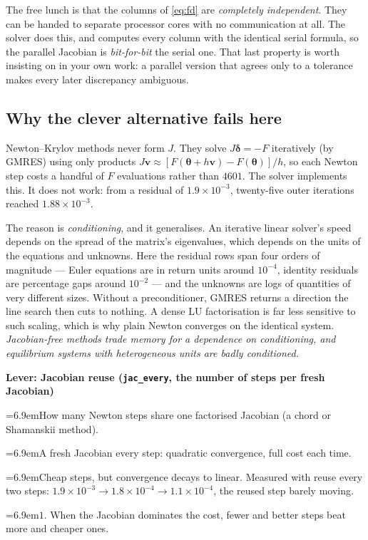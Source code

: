 \documentclass[10pt,a4paper]{article}
\newcommand{\leverrow}[2]{\par\noindent\hangindent=6.9em\hangafter=1\makebox[6.9em][l]{\textit{#1}}#2}
\newenvironment{lever}[1]{\par\begin{framed}\small\noindent\textcolor{levcol}{\textbf{Lever: #1}}\par\vspace{2pt}}{\end{framed}}
\theoremstyle{plain}
\theoremstyle{remark}
\newcommand{\pol}{\bm{\theta}}
\newcommand{\code}[1]{\texttt{#1}}
\begin{document}
The free lunch is that the columns of \eqref{eq:fd} are \emph{completely independent}. They can
be handed to separate processor cores with no communication at all. The solver does this, and
computes every column with the identical serial formula, so the parallel Jacobian is
\emph{bit-for-bit} the serial one. That last property is worth insisting on in your own work: a
parallel version that agrees only to a tolerance makes every later discrepancy ambiguous.

\subsection{Why the clever alternative fails here}

Newton--Krylov methods never form $J$. They solve $J\bm\delta = -F$ iteratively (by GMRES) using
only products $J\bm v\approx[F(\pol+h\bm v)-F(\pol)]/h$, so each Newton step costs a handful of
$F$ evaluations rather than $4601$. The solver implements this. It does not work: from a residual
of $1.9\times10^{-3}$, twenty-five outer iterations reached $1.88\times10^{-3}$.

The reason is \emph{conditioning}, and it generalises. An iterative linear solver's speed
depends on the spread of the matrix's eigenvalues, which depends on the units of the equations
and unknowns. Here the residual rows span four orders of magnitude --- Euler equations are in
return units around $10^{-4}$, identity residuals are percentage gaps around $10^{-2}$ --- and the
unknowns are logs of quantities of very different sizes. Without a preconditioner, GMRES returns
a direction the line search then cuts to nothing. A dense LU factorisation is far less sensitive
to such scaling, which is why plain Newton converges on the identical system.
\emph{Jacobian-free methods trade memory for a dependence on conditioning, and equilibrium systems
with heterogeneous units are badly conditioned.}

\begin{lever}{Jacobian reuse (\code{jac\_every}, the number of steps per fresh Jacobian)}
\leverrow{Controls}{How many Newton steps share one factorised Jacobian (a chord or Shamanskii
method).}
\leverrow{Push to 1}{A fresh Jacobian every step: quadratic convergence, full cost each time.}
\leverrow{Push up}{Cheap steps, but convergence decays to linear. Measured with reuse every two
steps: $1.9\times10^{-3}\to1.8\times10^{-4}\to1.1\times10^{-4}$, the reused step barely moving.}
\leverrow{Here}{$1$. When the Jacobian dominates the cost, fewer and better steps beat more and
cheaper ones.}
\end{lever}
\end{document}
